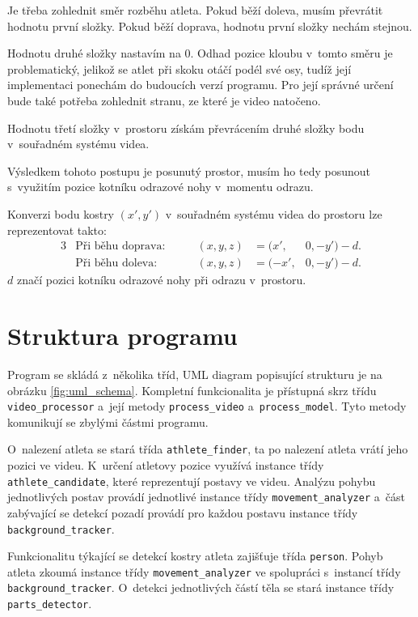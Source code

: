 Je třeba zohlednit směr rozběhu atleta. Pokud běží doleva, musím převrátit hodnotu první složky. Pokud běží doprava, hodnotu první složky nechám stejnou.

Hodnotu druhé složky nastavím na $0$. Odhad pozice kloubu v~tomto směru je problematický, jelikož se atlet při skoku otáčí podél své osy, tudíž její implementaci ponechám do budoucích verzí programu. Pro její správné určení bude také potřeba zohlednit stranu, ze které je video natočeno.

Hodnotu třetí složky v~prostoru získám převrácením druhé složky bodu v~souřadném systému videa.

Výsledkem tohoto postupu je posunutý prostor, musím ho tedy posunout s~využitím pozice kotníku odrazové nohy v~momentu odrazu.

Konverzi bodu kostry $(x',y')$ v~souřadném systému videa do prostoru lze reprezentovat takto:
\begin{alignat*}{3}
    &\text{Při běhu doprava:} &\qquad (x,y,z)&=(x',&0,-y')-d. \\
    &\text{Při běhu doleva:} &\qquad (x,y,z)&=(-x',&0,-y')-d.
\end{alignat*}
$d$ značí pozici kotníku odrazové nohy při odrazu v~prostoru.




\section{Struktura programu}

Program se skládá z~několika tříd, UML diagram popisující strukturu je na obrázku \ref{fig:uml_schema}. Kompletní funkcionalita je přístupná skrz třídu \texttt{video\_processor} a~její metody \texttt{process\_video} a~\texttt{process\_model}. Tyto metody komunikují se zbylými částmi programu.

O~nalezení atleta se stará třída \texttt{athlete\_finder}, ta po nalezení atleta vrátí jeho pozici ve videu. K~určení atletovy pozice využívá instance třídy \texttt{athlete\_candidate}, které reprezentují postavy ve videu. Analýzu pohybu jednotlivých postav provádí jednotlivé instance třídy \texttt{movement\_analyzer} a~část zabývající se detekcí pozadí provádí pro každou postavu instance třídy \texttt{background\_tracker}.

Funkcionalitu týkající se detekcí kostry atleta zajišťuje třída \texttt{person}. Pohyb atleta zkoumá instance třídy \texttt{movement\_analyzer} ve spolupráci s~instancí třídy \texttt{background\_tracker}. O~detekci jednotlivých částí těla se stará instance třídy \texttt{parts\_detector}.

